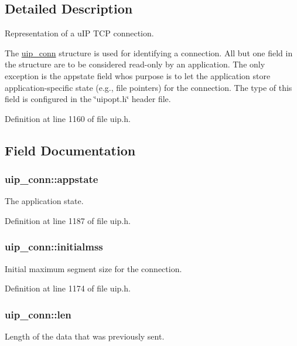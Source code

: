 \subsection{Detailed Description}
Representation of a uIP TCP connection.

The \hyperlink{structuip__conn}{uip\_\-conn} structure is used for identifying a connection. All but one field in the structure are to be considered read-\/only by an application. The only exception is the appstate field whos purpose is to let the application store application-\/specific state (e.g., file pointers) for the connection. The type of this field is configured in the \char`\"{}uipopt.h\char`\"{} header file. 

Definition at line 1160 of file uip.h.



\subsection{Field Documentation}
\hypertarget{structuip__conn_a97f9e1fda815bfb8b1f4577c355ade20}{
\subsubsection[{appstate}]{ {\bf uip\_\-conn::appstate}}}
\label{structuip__conn_a97f9e1fda815bfb8b1f4577c355ade20}
The application state. 

Definition at line 1187 of file uip.h.

\hypertarget{structuip__conn_adb7a3fadb68df5fdd37e8b91a2c751ea}{
\subsubsection[{initialmss}]{ {\bf uip\_\-conn::initialmss}}}
\label{structuip__conn_adb7a3fadb68df5fdd37e8b91a2c751ea}
Initial maximum segment size for the connection. 

Definition at line 1174 of file uip.h.

\hypertarget{structuip__conn_a0ef3ae2764714bf90620075c374c262e}{
\subsubsection[{len}]{ {\bf uip\_\-conn::len}}}
\label{structuip__conn_a0ef3ae2764714bf90620075c374c262e}
Length of the data that was previously sent. 

